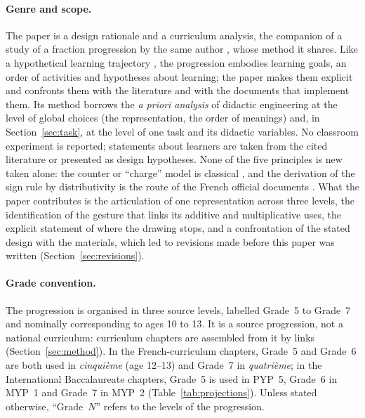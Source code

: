 \documentclass[11pt,a4paper]{article}
\theoremstyle{definition}
\begin{document}
\paragraph{Genre and scope.} The paper is a design rationale and a curriculum analysis, the companion of a study of a fraction progression by the same author \citep{TarielAdam2026Fractions}, whose method it shares. Like a hypothetical learning trajectory \citep{simon1995,clements2004}, the progression embodies learning goals, an order of activities and hypotheses about learning; the paper makes them explicit and confronts them with the literature and with the documents that implement them. Its method borrows the \emph{a priori analysis} of didactic engineering \citep{artigue1990,artigue1992} at the level of global choices (the representation, the order of meanings) and, in Section~\ref{sec:task}, at the level of one task and its didactic variables. No classroom experiment is reported; statements about learners are taken from the cited literature or presented as design hypotheses. None of the five principles is new taken alone: the counter or ``charge'' model is classical \citep{Battista1983}, and the derivation of the sign rule by distributivity is the route of the French official documents \citep{Eduscol2016Relatifs,MEN2026Exemples}. What the paper contributes is the articulation of one representation across three levels, the identification of the gesture that links its additive and multiplicative uses, the explicit statement of where the drawing stops, and a confrontation of the stated design with the materials, which led to revisions made before this paper was written (Section~\ref{sec:revisions}).

\paragraph{Grade convention.} The progression is organised in three source levels, labelled Grade~5 to Grade~7 and nominally corresponding to ages 10 to 13. It is a source progression, not a national curriculum: curriculum chapters are assembled from it by links (Section~\ref{sec:method}). In the French-curriculum chapters, Grade~5 and Grade~6 are both used in \emph{cinqui\`eme} (age 12--13) and Grade~7 in \emph{quatri\`eme}; in the International Baccalaureate chapters, Grade~5 is used in PYP~5, Grade~6 in MYP~1 and Grade~7 in MYP~2 (Table~\ref{tab:projections}). Unless stated otherwise, ``Grade~$N$'' refers to the levels of the progression.

\end{document}

